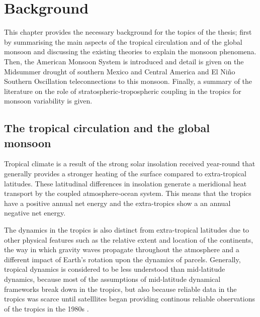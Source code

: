 

\chapter{\label{ch:2-litreview}Background}


 This chapter provides the necessary background for the topics of the thesis; first by summarising the main aspects of the tropical circulation and of the global monsoon and discussing the existing theories to explain the monsoon phenomena. Then, the American Monsoon System is introduced and detail is given on the Midsummer drought of southern Mexico and Central America and El Niño Southern Oscillation teleconnections to this monsoon. Finally, a summary of the literature on the role of stratospheric-tropospheric coupling in the tropics for monsoon variability is given. %
\section{The tropical circulation and the global monsoon}\label{sq:bk_tropics}

Tropical climate is a result of the strong solar insolation received year-round that generally provides a stronger heating of the surface compared to extra-tropical latitudes. These latitudinal differences in insolation generate a meridional heat transport by the coupled atmosphere-ocean system. This means that the tropics have a positive annual net energy and the extra-tropics show a an annual negative net energy. 

The dynamics in the tropics is also distinct from extra-tropical latitudes due to other physical features such as the relative extent and location of the continents, the way in which gravity waves propagate throughout the atmosphere and a different impact of Earth's rotation upon the dynamics of parcels. 
Generally, tropical dynamics is considered to be less understood than mid-latitude dynamics, because most of the assumptions of mid-latitude dynamical frameworks break down in the tropics, but also because reliable data in the tropics was scarce until satelllites began providing continous reliable observations of the tropics in the 1980s \citep{emanuel2007quasi,webster2020dynamics}.


